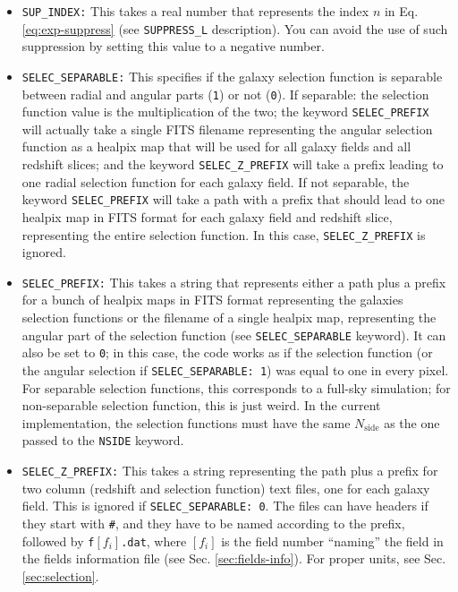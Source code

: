 \documentclass[12pt]{book} %
\newcommand{\nv}[1]{\mathrm{#1}}                 %
\begin{document}
\begin{itemize}
\item {\tt SUP\_INDEX:} This takes a real number that represents the index $n$ in Eq. 
  \ref{eq:exp-suppress} (see {\tt SUPPRESS\_L} description). You can avoid the use 
  of such suppression by setting this value to a negative number.

\item {\tt SELEC\_SEPARABLE:} This specifies if the galaxy selection function is separable between 
  radial and angular parts ({\tt 1}) or not ({\tt 0}). If separable: the selection function value is 
  the multiplication of the two; the keyword {\tt SELEC\_PREFIX} 
  will actually take a single FITS filename representing the angular selection function 
  as a {\sc healpix} map that will be used for all galaxy fields and all redshift slices; and the 
  keyword {\tt SELEC\_Z\_PREFIX} will take a prefix leading to one radial selection function for each 
  galaxy field. If not separable, the keyword {\tt SELEC\_PREFIX} will take a path with a prefix that 
  should lead to one {\sc healpix} map in FITS format for each galaxy field and redshift slice, 
  representing the entire selection function. In this case, {\tt SELEC\_Z\_PREFIX} is ignored.

\item {\tt SELEC\_PREFIX:} This takes a string that represents either a path plus a prefix for 
  a bunch of {\sc healpix} maps in FITS format representing the galaxies selection functions 
  or the filename of a single {\sc healpix} map, representing the angular 
  part of the selection function (see {\tt SELEC\_SEPARABLE} keyword). It can also be set to 
  {\tt 0}; in this case, the code works as if the selection function (or the angular selection 
  if {\tt SELEC\_SEPARABLE: 1}) was equal to one in every pixel. For separable selection functions, 
  this corresponds to a full-sky simulation; for non-separable selection function, this is just weird. 
  In the current implementation, the selection functions must have the same $N_{\nv{side}}$ as the one 
  passed to the {\tt NSIDE} keyword.

\item {\tt SELEC\_Z\_PREFIX:} This takes a string representing the path plus a prefix for 
  two column (redshift and selection function) text files, one for each galaxy field. 
  This is ignored if {\tt SELEC\_SEPARABLE: 0}. The files can have headers if they start with {\tt \#}, 
  and they have to be named according to the prefix, followed by {\tt f}$[f_i]${\tt .dat}, where 
  $[f_i]$ is the field number ``naming'' the field in the fields information file (see Sec. 
  \ref{sec:fields-info}). For proper units, see Sec. \ref{sec:selection}.


\end{itemize}
\end{document}
